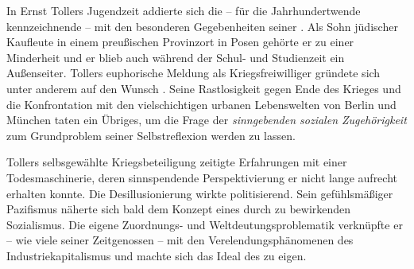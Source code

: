 


In Ernst Tollers Jugendzeit addierte sich die -- für die Jahrhundertwende
kennzeichnende -- \Cite{Identitätskrise des modernen
  Subjekts} 
mit den besonderen Gegebenheiten seiner \Cite{sozialen Randlage}. 
Als Sohn jüdischer Kaufleute in einem preußischen Provinzort in Posen gehörte
er zu einer Minderheit und er blieb auch während der Schul- und Studienzeit ein
Außenseiter. Tollers euphorische Meldung als Kriegsfreiwilliger gründete sich unter
anderem auf den Wunsch . Seine Rastlosigkeit
gegen Ende des Krieges und die Konfrontation mit den vielschichtigen 
urbanen Lebenswelten von Berlin und München taten ein Übriges, um die Frage
der \emph{sinngebenden sozialen Zugehörigkeit} zum Grundproblem seiner
Selbstreflexion werden zu lassen.

Tollers selbsgewählte Kriegsbeteiligung zeitigte Erfahrungen mit einer
Todesmaschinerie, deren sinnspendende Perspektivierung er nicht
lange aufrecht erhalten konnte. Die Desillusionierung wirkte politisierend. Sein
gefühlsmäßiger Pazifismus näherte sich bald dem Konzept eines durch \Cite{Erweckung}
zu bewirkenden Sozialismus. Die eigene Zuordnungs- und Weltdeutungsproblematik
verknüpfte er -- wie viele seiner Zeitgenossen -- mit den Verelendungsphänomenen
des Industriekapitalismus und machte sich das Ideal des \emph{\Cite{neuen
    Menschen}} zu eigen.

